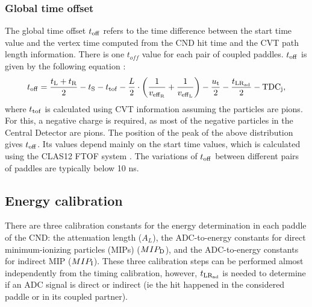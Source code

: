 \subsubsection{Global time offset}

The global time offset $t_{\rm{off}}$ refers to the time difference between the start time value and the vertex time computed from the CND hit time and the CVT path length information. There is one $t_{off}$ value for each pair of coupled paddles.
$t_{\rm{off}}$ is given by the following equation :
\begin{equation}
t_{\rm{off}} = \frac{t_{\rm{L}}+t_{\rm{R}}}{2} - t_{\rm{S}} - t_{\rm{tof}}
                    - \frac{L}{2} \cdot \left(\frac{1}{v_{\rm{eff}_{\rm{R}}}} + \frac{1}{v_{\rm{eff}_L}}\right) - \frac{u_{\rm{t}}}{2} - \frac{t_{\rm{LR}_{\rm{ad}}}}{2}-{\rm{TDC}}_{\rm{j}},
\end{equation}
where $t_{\rm{tof}}$ is calculated using CVT information assuming the particles are pions. For this, a negative charge is required, as most of the negative particles in the Central Detector are pions. The position of the peak of the above distribution gives $t_{\rm{off}}$. Its values depend mainly on the start time values, which is calculated using the CLAS12 FTOF system \cite{ftofref}. The variations of $t_{\rm{off}}$ between different pairs of paddles are typically below 10 ns.


\subsection{Energy calibration}

There are three calibration constants for the energy determination in each paddle of the CND: the attenuation length ($A_{L}$), the ADC-to-energy constants for direct minimum-ionizing particles (MIPs) ($MIP_{\rm{D}}$), and the ADC-to-energy constants for indirect MIP ($MIP_{\rm{I}}$).
These three calibration steps can be performed almost independently from the timing calibration, however, $t_{\rm{LR_{\rm{ad}}}}$ is needed to determine if an ADC signal is direct or indirect (ie the hit happened in the considered paddle or in its coupled partner).

